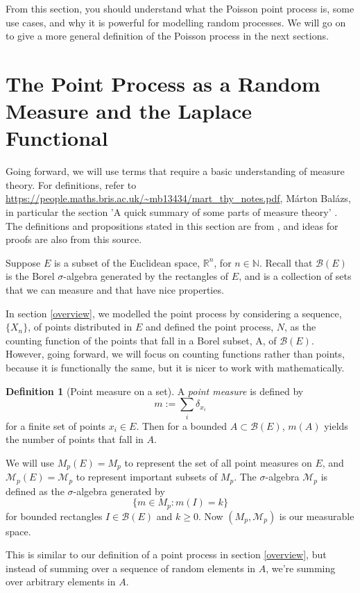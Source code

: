 \documentclass[11pt, oneside]{article}   	%
\theoremstyle{definition}
\newtheorem{definition}{Definition}[section]
\theoremstyle{remark}
\begin{document}
From this section, you should understand what the Poisson point process is, some use cases, and why it is powerful for modelling random processes. We will go on to give a more general definition of the Poisson process in the next sections.

\newpage
\section{The Point Process as a Random Measure and the Laplace Functional}
Going forward, we will use terms that require a basic understanding of measure theory. For definitions, refer to \url{https://people.maths.bris.ac.uk/~mb13434/mart_thy_notes.pdf}, Márton Balázs, in particular the section 'A quick summary of some parts of measure theory' \cite{marton2025}. The definitions and propositions stated in this section are from \cite{resnick2005}, and ideas for proofs are also from this source.

Suppose $E$ is a subset of the Euclidean space, $\mathbb{R}^n$, for $n \in \mathbb{N}$. Recall that $\mathcal{B}(E)$ is the Borel $\sigma$-algebra generated by the rectangles of $E$, and is a collection of sets that we can measure and that have nice properties.

In section \ref{overview}, we modelled the point process by considering a sequence, $\{X_n\}$, of points distributed in $E$ and defined the point process, $N$, as the counting function of the points that fall in a Borel subset, A, of $\mathcal{B}(E)$. However, going forward, we will focus on counting functions rather than points, because it is functionally the same, but it is nicer to work with mathematically.

\begin{definition}[Point measure on a set] \label{pm}
  A \textit{point measure} is defined by $$m:=\sum_{i} \delta_{x_i}$$
  for a finite set of points $x_i \in E$. Then for a bounded $A \subset \mathcal{B}(E)$, $m(A)$ yields the number of points that fall in $A$.

  We will use $M_p(E)=M_p$ to represent the set of all point measures on $E$, and $\mathcal{M}_p(E)=\mathcal{M}_p$ to represent important subsets of $M_p$. The $\sigma$-algebra $\mathcal{M}_p$ is defined as the $\sigma$-algebra generated by $$\{m \in M_p : m(I) = k\}$$ for bounded rectangles $I \in \mathcal{B}(E)$ and $k \geq 0$. Now $(M_p, \mathcal{M}_p)$ is our measurable space.
\end{definition}

This is similar to our definition of a point process in section \ref{overview}, but instead of summing over a sequence of random elements in $A$, we're summing over arbitrary elements in $A$.
\end{document}
